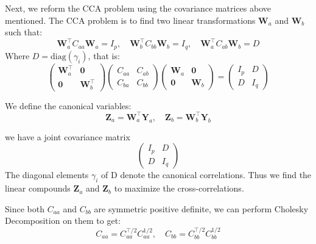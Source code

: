 Next, we reform the CCA problem using the covariance matrices above mentioned. The CCA problem is to find two linear transformations $\mathbf{W}_a$ and $\mathbf{W}_b$ such that:
\begin{equation}
     \mathbf{W}_a^\top C_{aa} \mathbf{W}_a = I_p, \quad  \mathbf{W}_b^\top C_{bb} \mathbf{W}_b = I_q, \quad  \mathbf{W}_a^\top C_{ab}  \mathbf{W}_b = D
\end{equation}
Where $D=\text{diag} (\gamma_i)$, that is:
\begin{equation}
\begin{pmatrix}
     \mathbf{W}_a^\top & {\mathbf 0}\\
    {\mathbf 0} &  \mathbf{W}_b^\top
    \end{pmatrix}
    \begin{pmatrix}
    C_{aa} & C_{ab}\\
    C_{ba} & C_{bb}
    \end{pmatrix}
    \begin{pmatrix}
     \mathbf{W}_a & {\mathbf 0}\\
    {\mathbf 0} &  \mathbf{W}_b
    \end{pmatrix}
    =
    \begin{pmatrix}
    I_p & D\\
    D & I_q
\end{pmatrix}
\end{equation}


We define the canonical variables:
\begin{equation}
    \mathbf{Z}_a= \mathbf{W}_a^\top \mathbf{Y}_a, \quad \mathbf{Z}_b = \mathbf{W}_b^\top \mathbf{Y}_b
\end{equation}

we have a joint covariance matrix
\begin{equation}
    \begin{pmatrix}
    I_p & D \\
    D & I_q
    \end{pmatrix}
\end{equation}
The diagonal elements $\gamma_i$ of D denote the canonical correlations. Thus we find the linear compounds $\mathbf{Z}_a$ and $\mathbf{Z}_b$ to maximize the cross-correlations. 

Since both $C_{aa}$ and $C_{bb}$ are symmetric positive definite, we can perform Cholesky Decomposition on them to get:
\begin{equation}
    C_{aa} = C_{aa}^{\top/2} C_{aa}^{1/2}, \quad C_{bb} = C_{bb}^{\top/2} C_{bb}^{1/2}
\end{equation}


